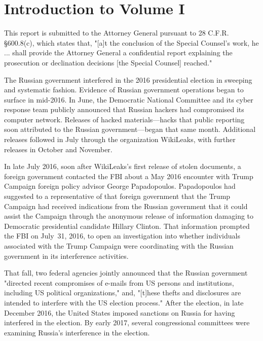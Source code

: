 \section*{Introduction to Volume I}
\label{sec:introduction-1}

This report is submitted to the Attorney General pursuant to 28 C.F.R. \S 600.8(c), which states that, "[a]t the conclusion of the Special Counsel's work, he ... shall provide the Attorney General a confidential report explaining the prosecution or declination decisions [the Special Counsel] reached."

The Russian government interfered in the 2016 presidential election in sweeping and systematic fashion.
Evidence of Russian government operations began to surface in mid-2016.
In June, the Democratic National Committee and its cyber response team publicly announced that Russian hackers had compromised its computer network. Releases of hacked materials---hacks that public reporting soon attributed to the Russian government---began that same month.
Additional releases followed in July through the organization WikiLeaks, with further releases in October and November.

In late July 2016, soon after WikiLeaks's first release of stolen documents, a foreign government contacted the FBI about a May 2016 encounter with Trump Campaign foreign policy advisor George Papadopoulos.
Papadopoulos had suggested to a representative of that foreign government that the Trump Campaign had received indications from the Russian government that it could assist the Campaign through the anonymous release of information damaging to Democratic presidential candidate Hillary Clinton.
That information prompted the FBI on July~31, 2016, to open an investigation into whether individuals associated with the Trump Campaign were coordinating with the Russian government in its interference activities.

That fall, two federal agencies jointly announced that the Russian government "directed recent compromises of e-mails from US persons and institutions, including US political organizations," and, "[t]hese thefts and disclosures are intended to interfere with the US election process."
After the election, in late December 2016, the United States imposed sanctions on Russia for having interfered in the election. By early 2017, several congressional committees were examining Russia's interference in the election.

